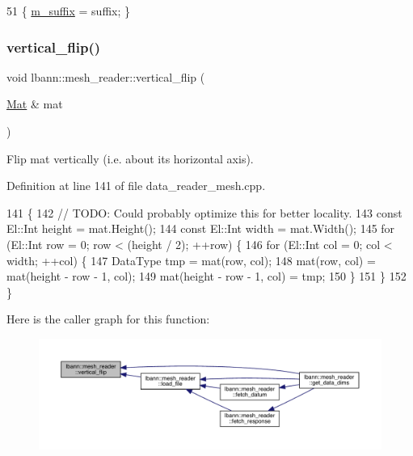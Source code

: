 \begin{DoxyCode}
51 \{ \hyperlink{classlbann_1_1mesh__reader_aefadeb4ee1b9202dcadb4625da21c451}{m\_suffix} = suffix; \}
\end{DoxyCode}
\mbox{\label{classlbann_1_1mesh__reader_a4b578dc1ba067a07748de0977d97b6bc}} 
\subsubsection{\texorpdfstring{vertical\+\_\+flip()}{vertical\_flip()}}
{\footnotesize\ttfamily void lbann\+::mesh\+\_\+reader\+::vertical\+\_\+flip (\begin{DoxyParamCaption}\item[{\hyperlink{base_8hpp_a68f11fdc31b62516cb310831bbe54d73}{Mat} \&}]{mat }\end{DoxyParamCaption})\hspace{0.3cm}{\ttfamily [protected]}}



Flip mat vertically (i.\+e. about its horizontal axis). 



Definition at line 141 of file data\+\_\+reader\+\_\+mesh.\+cpp.


\begin{DoxyCode}
141                                         \{
142   \textcolor{comment}{// TODO: Could probably optimize this for better locality.}
143   \textcolor{keyword}{const} El::Int height = mat.Height();
144   \textcolor{keyword}{const} El::Int width = mat.Width();
145   \textcolor{keywordflow}{for} (El::Int row = 0; row < (height / 2); ++row) \{
146     \textcolor{keywordflow}{for} (El::Int col = 0; col < width; ++col) \{
147       DataType tmp = mat(row, col);
148       mat(row, col) = mat(height - row - 1, col);
149       mat(height - row - 1, col) = tmp;
150     \}
151   \}
152 \}
\end{DoxyCode}
Here is the caller graph for this function\+:\nopagebreak
\begin{figure}[H]
\begin{center}
\leavevmode
\includegraphics[width=350pt]{classlbann_1_1mesh__reader_a4b578dc1ba067a07748de0977d97b6bc_icgraph}
\end{center}
\end{figure}


